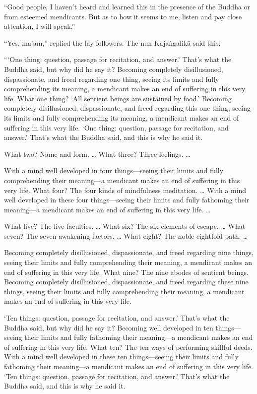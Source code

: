 \documentclass[12pt,openany]{book}%
\begin{document}
“Good people, I haven’t heard and learned this in the presence of the Buddha or from esteemed mendicants. But as to how it seems to me, listen and pay close attention, I will speak.” 

“Yes, ma’am,” replied the lay followers. The nun \textsanskrit{Kajaṅgalikā} said this: 

“‘One thing: question, passage for recitation, and answer.’ That’s what the Buddha said, but why did he say it? Becoming completely disillusioned, dispassionate, and freed regarding one thing, seeing its limits and fully comprehending its meaning, a mendicant makes an end of suffering in this very life. What one thing? ‘All sentient beings are sustained by food.’ Becoming completely disillusioned, dispassionate, and freed regarding this one thing, seeing its limits and fully comprehending its meaning, a mendicant makes an end of suffering in this very life. ‘One thing: question, passage for recitation, and answer.’ That’s what the Buddha said, and this is why he said it. 

What two? Name and form. … What three? Three feelings. … 

With a mind well developed in four things—seeing their limits and fully comprehending their meaning—a mendicant makes an end of suffering in this very life. What four? The four kinds of mindfulness meditation. … With a mind well developed in these four things—seeing their limits and fully fathoming their meaning—a mendicant makes an end of suffering in this very life. … 

What five? The five faculties. … What six? The six elements of escape. … What seven? The seven awakening factors. … What eight? The noble eightfold path. … 

Becoming completely disillusioned, dispassionate, and freed regarding nine things, seeing their limits and fully comprehending their meaning, a mendicant makes an end of suffering in this very life. What nine? The nine abodes of sentient beings. Becoming completely disillusioned, dispassionate, and freed regarding these nine things, seeing their limits and fully comprehending their meaning, a mendicant makes an end of suffering in this very life. 

‘Ten things: question, passage for recitation, and answer.’ That’s what the Buddha said, but why did he say it? Becoming well developed in ten things—seeing their limits and fully fathoming their meaning—a mendicant makes an end of suffering in this very life. What ten? The ten ways of performing skillful deeds. With a mind well developed in these ten things—seeing their limits and fully fathoming their meaning—a mendicant makes an end of suffering in this very life. ‘Ten things: question, passage for recitation, and answer.’ That’s what the Buddha said, and this is why he said it. 
\end{document}
